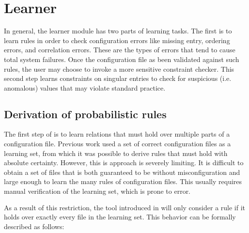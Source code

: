 
\section{Learner}
\label{sec-learn}


In general, the learner module has two parts of learning tasks.
The first is to learn rules in order to check configuration errors like
missing entry, ordering errors, and correlation errors. These are the types of errors that tend to cause total system failures.
Once the configuration file as been validated against such rules, the user may choose to invoke a more sensitive constraint checker. This second step learns constraints on singular entries to check for suspicious (i.e. anomalous) values that may violate standard practice.

\subsection{Derivation of probabilistic rules}
\label{subsec-rules}

The first step of \app is to learn relations that must hold over multiple parts of a configuration file.
Previous work used a set of correct configuration files as a learning set, from which it was possible to derive rules that must hold with absolute certainty\cite{santolucitoCAV}. 
However, this is approach is severely limiting. 
It is difficult to obtain a set of files that is both guaranteed to be without misconfiguration and large enough to learn the many rules of configuration files.
This usually requires manual verification of the learning set, which is prone to error.

As a result of this restriction, the tool introduced in \cite{santolucitoCAV} will only consider a rule if it holds over exactly every file in the learning set. This behavior can be formally described as follows:

